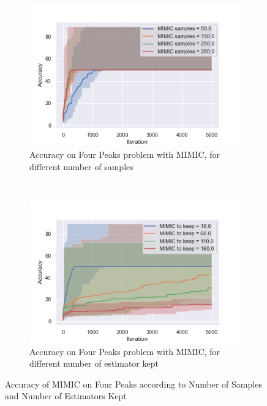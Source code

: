 \documentclass[twocolumn, 10pt]{article}
\begin{document}
				\begin{figure}[h]
					\centering
					\begin{subfigure}[t]{0.45\columnwidth}
						\centering
						\includegraphics[width=\linewidth]{../graphics/four_peaks_MIMIC_Iteration_Error_MIMIC_samples.png}
						\caption{Accuracy on Four Peaks problem with MIMIC, for different number of samples}
						\label{fp:mimic_samples}
					\end{subfigure}
					~
					\begin{subfigure}[t]{0.45\columnwidth}
						\centering
						\includegraphics[width=\linewidth]{../graphics/four_peaks_MIMIC_Iteration_Error_MIMIC_to_keep.png}
						\caption{Accuracy on Four Peaks problem with MIMIC, for different number of estimator kept}
						\label{fp:mimic_to_keep}
					\end{subfigure}
					\caption{Accuracy of MIMIC on Four Peaks according to Number of Samples and Number of Estimators Kept}
					\label{fp:mimic}
				\end{figure}
\end{document}
